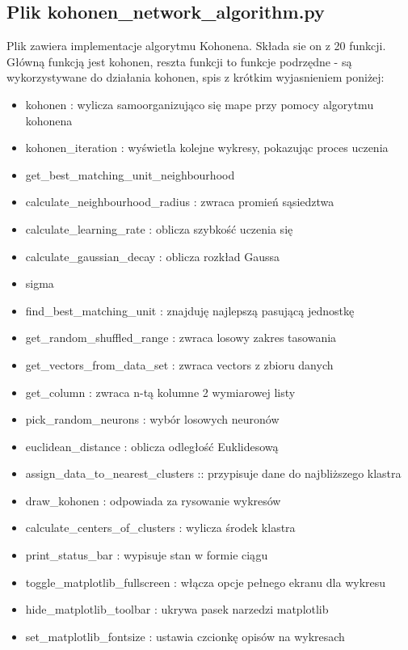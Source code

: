 \documentclass{classrep}
\begin{document}
{	\subsection{Plik  kohonen\_network\_algorithm.py}
	{
		Plik zawiera implementacje algorytmu Kohonena. Składa sie on z 20 funkcji. Główną funkcją jest kohonen, reszta funkcji to funkcje podrzędne - są wykorzystywane do działania kohonen, spis z krótkim wyjasnieniem poniżej: 
\begin{itemize}
\item kohonen : wylicza samoorganizująco się mape przy pomocy algorytmu kohonena
\item kohonen\_iteration : wyświetla kolejne wykresy, pokazując proces uczenia
\item get\_best\_matching\_unit\_neighbourhood
\item calculate\_neighbourhood\_radius : zwraca promień sąsiedztwa
\item calculate\_learning\_rate : oblicza szybkość uczenia się
\item calculate\_gaussian\_decay : oblicza rozkład Gaussa
\item sigma
\item find\_best\_matching\_unit : znajduję najlepszą pasującą jednostkę
\item get\_random\_shuffled\_range : zwraca losowy zakres tasowania
\item get\_vectors\_from\_data\_set : zwraca vectors z zbioru danych
\item get\_column : zwraca n-tą kolumne 2 wymiarowej listy
\item pick\_random\_neurons : wybór losowych neuronów
\item euclidean\_distance : oblicza odległość Euklidesową
\item assign\_data\_to\_nearest\_clusters :: przypisuje dane do najbliższego klastra
\item draw\_kohonen : odpowiada za rysowanie wykresów
\item calculate\_centers\_of\_clusters : wylicza środek klastra
\item print\_status\_bar : wypisuje stan w formie ciągu
\item toggle\_matplotlib\_fullscreen : włącza opcje pełnego ekranu dla wykresu
\item hide\_matplotlib\_toolbar : ukrywa pasek narzedzi matplotlib
\item set\_matplotlib\_fontsize : ustawia czcionkę opisów na wykresach
\end{itemize}
	}
}
\end{document}
